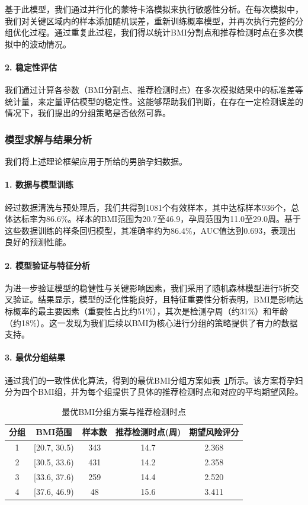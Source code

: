 \documentclass[12pt,a4paper]{ctexart}
\numberwithin{equation}{section}
\theoremstyle{mcm}
\begin{document}
基于此模型，我们通过并行化的蒙特卡洛模拟来执行敏感性分析。在每次模拟中，我们对关键区域内的样本添加随机误差，重新训练概率模型，并再次执行完整的分组优化过程。通过重复此过程，我们得以统计BMI分割点和推荐检测时点在多次模拟中的波动情况。

\paragraph{2. 稳定性评估}
我们通过计算各参数（BMI分割点、推荐检测时点）在多次模拟结果中的标准差等统计量，来定量评估模型的稳定性。这能够帮助我们判断，在存在一定检测误差的情况下，我们提出的分组策略是否依然可靠。

\subsubsection{模型求解与结果分析}

我们将上述理论框架应用于所给的男胎孕妇数据。

\paragraph{1. 数据与模型训练}
经过数据清洗与预处理后，我们共得到1081个有效样本，其中达标样本936个，总体达标率为86.6\%。样本的BMI范围为20.7至46.9，孕周范围为11.0至29.0周。基于这些数据训练的样条回归模型，其准确率约为86.4\%，AUC值达到0.693，表现出良好的预测性能。

\paragraph{2. 模型验证与特征分析}
为进一步验证模型的稳健性与关键影响因素，我们采用了随机森林模型进行5折交叉验证。结果显示，模型的泛化性能良好，且特征重要性分析表明，BMI是影响达标概率的最主要因素（重要性占比约51\%），其次是检测孕周（约31\%）和年龄（约18\%）。这一发现为我们后续以BMI为核心进行分组的策略提供了有力的数据支持。

\paragraph{3. 最优分组结果}
通过我们的一致性优化算法，得到的最优BMI分组方案如表~\ref{tab:optimal_grouping}所示。该方案将孕妇分为四个BMI组，并为每个组提供了具体的推荐检测时点和对应的平均期望风险。

\begin{table}[htbp]
\centering
\caption{最优BMI分组方案与推荐检测时点}
\label{tab:optimal_grouping}
\begin{tabular}{ccccc}
\toprule
分组 & BMI范围 & 样本数 & 推荐检测时点(周) & 期望风险评分 \\
\midrule
1 & [20.7, 30.5) & 343 & 14.7 & 2.368 \\
2 & [30.5, 33.6) & 431 & 14.2 & 2.358 \\
3 & [33.6, 37.6) & 259 & 14.4 & 2.520 \\
4 & [37.6, 46.9) & 48 & 15.6 & 3.411 \\
\bottomrule
\end{tabular}
\end{table}
\end{document}
